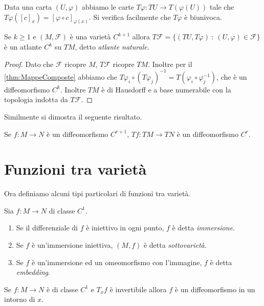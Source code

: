 Data una carta $(U,\varphi)$ abbiamo le carte $T\varphi:TU\to T(\varphi(U))$ tale che $T\varphi([c]_x)=[\varphi\circ c]_{\varphi(x)}$. Si verifica facilmente che $T\varphi$ è biunivoca.
 
\begin{proposition} 
	Se $k\ge 1$ e $(M,\mathcal F)$ è una varietà $C^{k+1}$ allora $T\mathcal F=\{(TU,T\varphi)\ :\ (U,\varphi)\in\mathcal F\}$ è un atlante $C^k$ su $TM$, detto \emph{atlante naturale}.
\end{proposition}

\begin{proof}
	Dato che $\mathcal F$ ricopre $M$, $T\mathcal F$ ricopre $TM$. Inoltre per il \cref{thm:MappeComposte} abbiamo che  $T\varphi_i\circ(T\varphi_j)^{-1}=T(\varphi_i\circ\varphi_j^{-1})$, che è un diffeomorfismo $C^k$.
	Inoltre $TM$ è di Hausdorff e a base numerabile con la topologia indotta da $T\mathcal F$.
\end{proof}

Similmente si dimostra il seguente risultato.

\begin{proposition}
	Se $f:M\to N$ è un diffeomorfismo $C^{r+1}$, $Tf:TM\to TN$ è un diffeomorfismo $C^r$.
\end{proposition}

\section{Funzioni tra varietà}
Ora definiamo alcuni tipi particolari di funzioni tra varietà.
 
\begin{definition}
	Sia $f:M\to N$ di classe $C^1$.
	\begin{enumerate}
	\item Se il differenziale di $f$ è iniettivo in ogni punto, $f$ è detta \emph{immersione}. 
	\item Se $f$ è un'immersione iniettiva, $(M,f)$ è detta \emph{sottovarietà}. 
	\item Se $f$ è un'immersione ed un omeomorfismo con l'immagine, $f$ è detta \emph{embedding}. 
	\end{enumerate}
\end{definition}

\begin{proposition}
	Se $f:M\to N$ è di classe $C^1$ e $T_xf$ è invertibile allora $f$ è un diffeomorfismo in un intorno di $x$.
\end{proposition}

